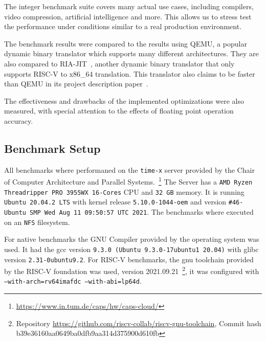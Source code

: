 \documentclass[course=eragp]{aspdoc}
\begin{document}
\par

The integer benchmark suite covers many actual use cases, including compilers,
video compression, artificial intelligence and more. This allows us to stress
test the performance under conditions similar to a real production environment.

\par

The benchmark results were compared to the results using QEMU, a popular dynamic
binary translator which supports many different architectures.
They are also compared to RIA-JIT~\cite{ria_jit_repo}, another dynamic binary translator that only
supports RISC-V to x86\_64 translation. This translator also claims to be faster
than QEMU in its project description paper~\cite{ria_jit_paper}.

\par

The effectiveness and drawbacks of the implemented optimizations were also measured,
with special attention to the effects of floating point operation accuracy.

\subsection{Benchmark Setup}

All benchmarks where performaned on the \texttt{time-x} server provided by the
Chair of Computer Architecture and Parallel Systems.~\footnote{\url{https://www.in.tum.de/caps/hw/caps-cloud/}} %
The Server has a \texttt{AMD Ryzen Threadripper PRO 3955WX 16-Cores} CPU and \texttt{32 GB} memory.
It is running \texttt{Ubuntu 20.04.2 LTS} with kernel release \texttt{5.10.0-1044-oem}
and version \texttt{\#46-Ubuntu SMP Wed Aug 11 09:50:57 UTC 2021}.
The benchmarks where executed on an \texttt{NFS} filesystem.

For native benchmarks the GNU Compiler provided by the operating system was used. It had the gcc
version \texttt{9.3.0 (Ubuntu 9.3.0-17ubuntu1~20.04)} with glibc version \texttt{2.31-0ubuntu9.2}.
For RISC-V benchmarks, the gnu toolchain provided by the RISC-V foundation was used,
version 2021.09.21~\footnote{Repository \url{https://github.com/riscv-collab/riscv-gnu-toolchain}, Commit hash b39e36160aa0649ba0dfb9aa314d375900d610fb},
it was configured with \texttt{--with-arch=rv64imafdc --with-abi=lp64d}.

\par
\end{document}
